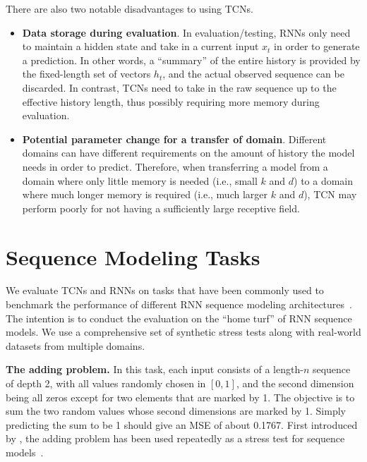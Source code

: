 \documentclass{article}
\newcommand\mypara[1]{\vspace{0mm}\noindent\textbf{#1}}
\begin{document}
There are also two notable disadvantages to using TCNs.
\begin{itemize}[leftmargin=*]
\setlength{\itemsep}{0mm}
\setlength{\parskip}{1mm}
\item \textbf{Data storage during evaluation}. In evaluation/testing, RNNs only
need to maintain a hidden state and take in a current input $x_t$ in order to
generate a prediction. In other words, a ``summary'' of the entire history is
provided by the fixed-length set of vectors $h_t$, and the actual
observed sequence can be discarded.  In contrast, TCNs need to take in the raw
sequence up to the effective history length, thus
possibly requiring more memory during evaluation.

\item \textbf{Potential parameter change for a transfer of domain}. Different
domains can have different requirements on the amount of history the model needs
in order to predict. Therefore, when transferring a model from a domain where only
little memory is needed (i.e., small $k$ and $d$) to a domain where much longer
memory is required (i.e., much larger $k$ and $d$), TCN may perform poorly for
not having a sufficiently large receptive field.
\end{itemize}



\section{Sequence Modeling Tasks}
\label{app-tasks}

We evaluate TCNs and RNNs on tasks that have been commonly used to benchmark
the performance of different RNN sequence modeling architectures~\cite{Hermans2013,
chung2014empirical,Pascanu2014:ICLR,leIRNN,jozefowicz2015empirical,Zhang2016NIPS}.
The intention is to conduct the evaluation on the ``home turf'' of RNN sequence
models. We use a comprehensive set of synthetic stress tests along with real-world datasets from multiple domains.

\mypara{The adding problem.} In this task, each input consists of a length-$n$
sequence of depth 2, with all values randomly chosen in $[0, 1]$, and the
second dimension being all zeros except for two elements that are marked by 1.
The objective is to sum the two random values whose second dimensions are
marked by 1. Simply predicting the sum to be 1 should give an MSE of about
0.1767. First introduced by \citet{hochreiterLSTM}, the adding problem has been used repeatedly as a stress test for sequence models~\cite{MartensRNNHF,pascanu2013difficulty,leIRNN,arjovsky2016unitary,Zhang2016NIPS}.
\end{document}
